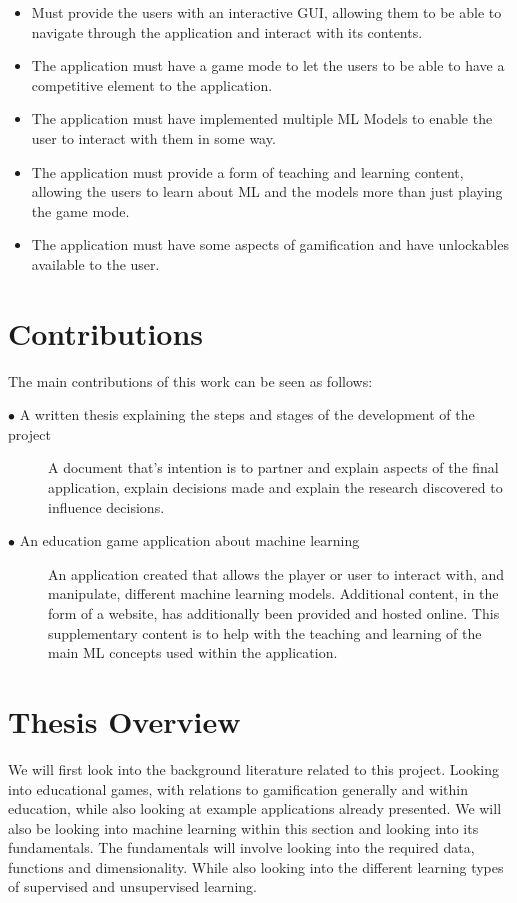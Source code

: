 	\begin{itemize}
		\item Must provide the users with an interactive GUI, allowing them to be able to navigate through the application and interact with its contents.
		\item The application must have a game mode to let the users to be able to have a competitive element to the application.
		\item The application must have implemented multiple ML Models to enable the user to interact with them in some way.
		\item The application must provide a form of teaching and learning content, allowing the users to learn about ML and the models more than just playing the game mode.
		\item The application must have some aspects of gamification and have unlockables available to the user.
	\end{itemize}
	
	
	\section{Contributions} 
		\label{sec:intro_contribs} 
		
		The main contributions of this work can be seen as follows:
		
		\begin{description}	
		
			\item[$\bullet$ A written thesis explaining the steps and stages of the development of the project]\hfill
			
			A document that's intention is to partner and explain aspects of the final application, explain decisions made and explain the research discovered to influence decisions.  
			
			\item[$\bullet$ An education game application about machine learning]\hfill
			
			An application created that allows the player or user to interact with, and manipulate, different machine learning models. Additional content, in the form of a website, has additionally been provided and hosted online. This supplementary content is to help with the teaching and learning of the main ML concepts used within the application.

		\end{description}
	
	\section{Thesis Overview}  
		\label{sec:intro_thesis_overview} 
		We will first look into the background literature related to this project. Looking into educational games, with relations to gamification generally and within education, while also looking at example applications already presented. We will also be looking into machine learning within this section and looking into its fundamentals. The fundamentals will involve looking into the required data, functions and dimensionality. While also looking into the different learning types of supervised and unsupervised learning.
		
